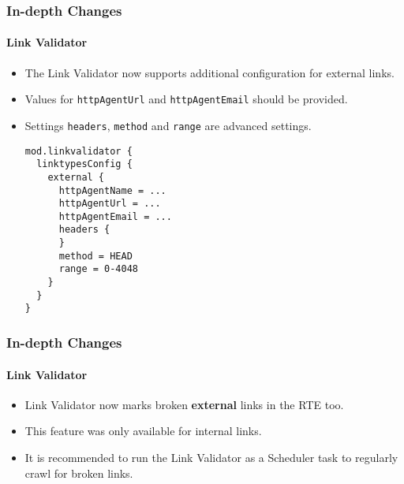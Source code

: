 
\begin{frame}[fragile]
	\frametitle{In-depth Changes}
	\framesubtitle{Link Validator}

	\lstset{basicstyle=\tiny\ttfamily}

	\begin{itemize}
		\item The Link Validator now supports additional configuration for external links.
		\item Values for \texttt{httpAgentUrl} and \texttt{httpAgentEmail} should be provided.
		\item Settings \texttt{headers}, \texttt{method} and \texttt{range} are advanced settings.
\begin{lstlisting}
mod.linkvalidator {
  linktypesConfig {
    external {
      httpAgentName = ...
      httpAgentUrl = ...
      httpAgentEmail = ...
      headers {
      }
      method = HEAD
      range = 0-4048
    }
  }
}
\end{lstlisting}

	\end{itemize}

\end{frame}


\begin{frame}[fragile]
	\frametitle{In-depth Changes}
	\framesubtitle{Link Validator}

	\begin{itemize}
		\item Link Validator now marks broken \textbf{external} links in the RTE too.
		\item This feature was only available for internal links.
		\item It is recommended to run the Link Validator as a Scheduler task to regularly crawl for broken links.
	\end{itemize}

\end{frame}




